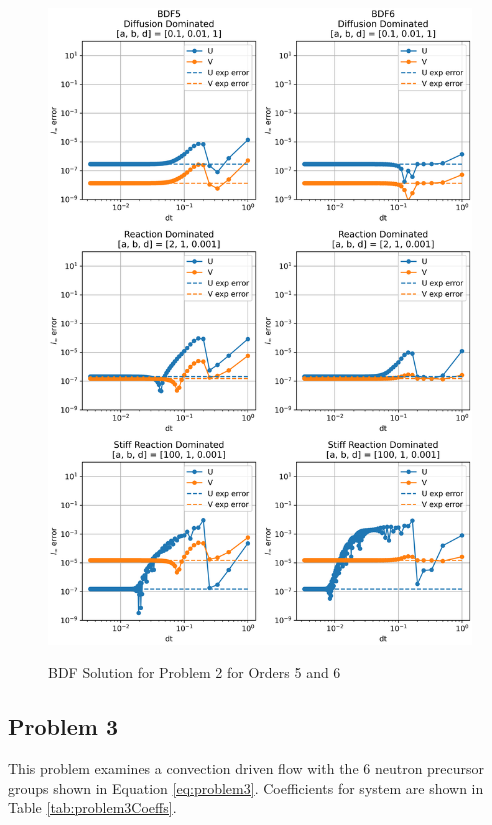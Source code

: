 \begin{figure}[t]
  \centering
  \includegraphics[width=5.75in]{images/BDF5BDF6problem2.png}\\
  \caption{BDF Solution for Problem 2 for Orders 5 and 6}
  \label{fig:errorProblem2BDF5and6}
\end{figure} 

\FloatBarrier


\subsection{Problem 3}
This problem examines a convection driven flow with the 6 neutron precursor groups shown in Equation \ref{eq:problem3}. Coefficients for system are shown in Table \ref{tab:problem3Coeffs}. 

